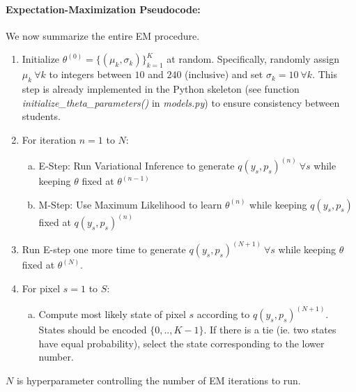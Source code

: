 \documentclass[11pt]{article}
\begin{document}
\paragraph{Expectation-Maximization Pseudocode:}
We now summarize the entire EM procedure.
\begin{enumerate}
\item Initialize $\theta^{(0)}=\{ (\mu_k, \sigma_k) \}^K_{k=1}$ at random. Specifically, randomly assign $\mu_k \: \forall k$ to integers between $10$ and $240$ (inclusive) and set $\sigma_k=10 \:\forall k$. This step is already implemented in the Python skeleton (see function \textit{initialize\_theta\_parameters()} in \textit{models.py}) to ensure consistency between students.
\item For iteration $n = 1$ to $N$:
    \begin{enumerate}[(a)]
        \item E-Step: Run Variational Inference to generate $q(y_s,p_s)^{(n)} \: \forall s$ while keeping $\theta$ fixed at $\theta^{(n-1)}$
        \item M-Step: Use Maximum Likelihood to learn $\theta^{(n)}$ while keeping $q(y_s,p_s)$ fixed at $q(y_s,p_s)^{(n)}$
    \end{enumerate}
\item Run E-step one more time to generate $q(y_s,p_s)^{(N+1)} \: \forall s$ while keeping $\theta$ fixed at $\theta^{(N)}$.
\item For pixel $s = 1$ to $S$:
    \begin{enumerate}[(a)]
        \item Compute most likely state of pixel $s$ according to $q(y_s,p_s)^{(N+1)}$. States should be encoded $\{0,..,K-1\}$. If there is a tie (ie. two states have equal probability), select the state corresponding to the lower number.
    \end{enumerate}


\end{enumerate}

$N$ is hyperparameter controlling the number of EM iterations to run.
\end{document}
